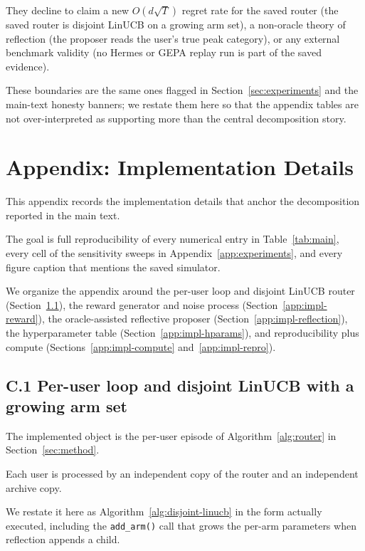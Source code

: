 \documentclass{article} %
\begin{document}
They decline to claim a new $O(d\sqrt{T})$ regret rate for the saved router (the saved router is disjoint LinUCB on a growing arm set), a non-oracle theory of reflection (the proposer reads the user's true peak category), or any external benchmark validity (no Hermes or GEPA replay run is part of the saved evidence).

These boundaries are the same ones flagged in Section~\ref{sec:experiments} and the main-text honesty banners; we restate them here so that the appendix tables are not over-interpreted as supporting more than the central decomposition story.

\section{Appendix: Implementation Details}

\label{app:implementation}

This appendix records the implementation details that anchor the decomposition reported in the main text.

The goal is full reproducibility of every numerical entry in Table~\ref{tab:main}, every cell of the sensitivity sweeps in Appendix~\ref{app:experiments}, and every figure caption that mentions the saved simulator.

We organize the appendix around the per-user loop and disjoint LinUCB router (Section~\ref{app:impl-loop}), the reward generator and noise process (Section~\ref{app:impl-reward}), the oracle-assisted reflective proposer (Section~\ref{app:impl-reflection}), the hyperparameter table (Section~\ref{app:impl-hparams}), and reproducibility plus compute (Sections~\ref{app:impl-compute} and~\ref{app:impl-repro}).

\subsection{C.1 Per-user loop and disjoint LinUCB with a growing arm set}

\label{app:impl-loop}

The implemented object is the per-user episode of Algorithm~\ref{alg:router} in Section~\ref{sec:method}.

Each user is processed by an independent copy of the router and an independent archive copy.

We restate it here as Algorithm~\ref{alg:disjoint-linucb} in the form actually executed, including the \texttt{add\_arm()} call that grows the per-arm parameters when reflection appends a child.
\end{document}
